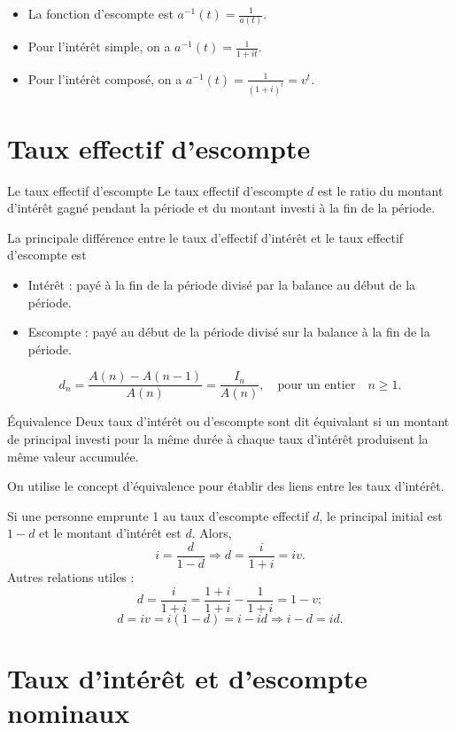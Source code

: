 \begin{itemize}
	\item La fonction d'escompte est 
	$\displaystyle a^{-1}(t) = \frac{1}{a(t)}.$
	\item Pour l'intérêt simple, on a 
	$\displaystyle a^{-1}(t) = \frac{1}{1 + it}.$
	\item Pour l'intérêt composé, on a 
	$\displaystyle a^{-1}(t) = \frac{1}{(1 + i)^t} = v^t.$
\end{itemize}

\section{Taux effectif d'escompte}

\begin{definition}{Le taux effectif d'escompte}{}
	Le taux effectif d'escompte $d$ est le ratio du montant d'intérêt gagné pendant la période et du montant investi à la fin de la période.
\end{definition}

La principale différence entre le taux d'effectif d'intérêt et le taux effectif d'escompte est 
\begin{itemize}
	\item Intérêt : payé à la fin de la période divisé par la balance au début de la période.
	\item Escompte : payé au début de la période divisé sur la balance à la fin de la période. 
\end{itemize}

$$d_n = \frac{A(n) - A(n-1)}{A(n)} = \frac{I_n}{A(n)}, \quad \text{pour un entier} \quad n \geq 1.$$

\begin{definition}{Équivalence}{}
	Deux taux d'intérêt ou d'escompte sont dit équivalant si un montant de principal investi pour la même durée à chaque taux d'intérêt produisent la même valeur accumulée. 
\end{definition}

On utilise le concept d'équivalence pour établir des liens entre les taux d'intérêt. 

Si une personne emprunte 1 au taux d'escompte effectif $d$, le principal initial est $1-d$ et le montant d'intérêt est $d$. Alors, 
$$i = \frac{d}{1-d} \Rightarrow d = \frac{i}{1 + i} = iv.$$
Autres relations utiles : 
$$d = \frac{i}{1 + i} = \frac{1 + i}{1 + i} - \frac{1}{1 + i} = 1 - v;$$
$$d = iv = i(1-d) = i - id \Rightarrow i - d = id.$$

\section{Taux d'intérêt et d'escompte nominaux}

